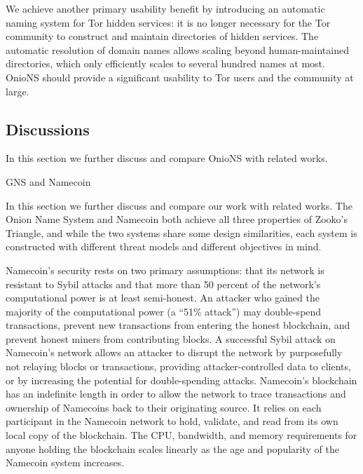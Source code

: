 \documentclass[USenglish,oneside,twocolumn]{article}
\begin{document}

We achieve another primary usability benefit by introducing an automatic naming system for Tor hidden services: it is no longer necessary for the Tor community to construct and maintain directories of hidden services. The automatic resolution of domain names allows scaling beyond human-maintained directories, which only efficiently scales to several hundred names at most. OnioNS should provide a significant usability to Tor users and the community at large.

\subsection{Discussions} %

In this section we further discuss and compare OnioNS with related works. 

GNS and Namecoin



In this section we further discuss and compare our work with related works. The Onion Name System and Namecoin both achieve all three properties of Zooko's Triangle, and while the two systems share some design similarities, each system is constructed with different threat models and different objectives in mind.

Namecoin's security rests on two primary assumptions: that its network is resistant to Sybil attacks and that more than 50 percent of the network's computational power is at least semi-honest. An attacker who gained the majority of the computational power (a ``51\% attack'') may double-spend transactions, prevent new transactions from entering the honest blockchain, and prevent honest miners from contributing blocks. A successful Sybil attack on Namecoin's network allows an attacker to disrupt the network by purposefully not relaying blocks or transactions, providing attacker-controlled data to clients, or by increasing the potential for double-spending attacks. Namecoin's blockchain has an indefinite length in order to allow the network to trace transactions and ownership of Namecoins back to their originating source. It relies on each participant in the Namecoin network to hold, validate, and read from its own local copy of the blockchain. The CPU, bandwidth, and memory requirements for anyone holding the blockchain scales linearly as the age and popularity of the Namecoin system increases.
\end{document}
